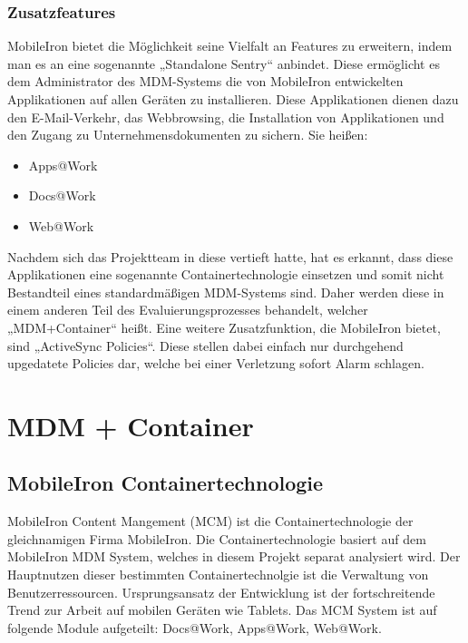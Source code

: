 \subsubsection{Zusatzfeatures}
MobileIron bietet die Möglichkeit seine Vielfalt an Features zu erweitern, indem man es an eine sogenannte „Standalone Sentry“ anbindet. Diese ermöglicht es dem Administrator des MDM-Systems die von MobileIron entwickelten Applikationen auf allen Geräten zu installieren. Diese Applikationen dienen dazu den E-Mail-Verkehr, das Webbrowsing, die Installation von Applikationen und den Zugang zu Unternehmensdokumenten zu sichern. Sie heißen:
\begin{itemize}
	\item Apps@Work
	\item Docs@Work
	\item Web@Work
\end{itemize}
Nachdem sich das Projektteam in diese vertieft hatte, hat es erkannt, dass diese Applikationen eine sogenannte Containertechnologie einsetzen und somit nicht Bestandteil eines standardmäßigen MDM-Systems sind. Daher werden diese in einem anderen Teil des Evaluierungsprozesses behandelt, welcher „MDM+Container“ heißt. Eine weitere Zusatzfunktion, die MobileIron bietet, sind „ActiveSync Policies“. Diese stellen dabei einfach nur durchgehend upgedatete Policies dar, welche bei einer Verletzung sofort Alarm schlagen.

\newpage
\section{MDM + Container}
\subsection{MobileIron Containertechnologie}
MobileIron Content Mangement (MCM) ist die Containertechnologie der gleichnamigen Firma MobileIron. Die Containertechnologie basiert auf dem MobileIron MDM System, welches in diesem Projekt separat analysiert wird. \newline
Der Hauptnutzen dieser bestimmten Containertechnolgie ist die Verwaltung von Benutzerressourcen. Ursprungsansatz der Entwicklung ist der fortschreitende Trend zur Arbeit auf mobilen Geräten wie Tablets. Das MCM System ist auf folgende Module aufgeteilt: Docs@Work, Apps@Work, Web@Work.
